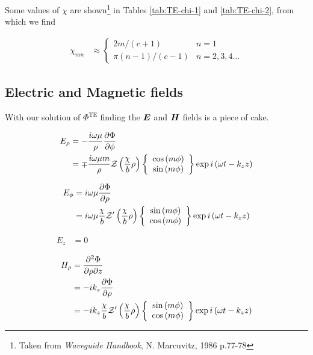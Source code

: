 \documentclass[twoside, a4paper]{article}
\begin{document}
Some values of $\chi$ are shown\footnote{Taken from \textit{Waveguide Handbook}, N. Marcuvitz, 1986 p.77-78} in Tables \ref{tab:TE-chi-1} and \ref{tab:TE-chi-2}, from which we find

\begin{align}
\chi_{mn} & \approx 
\left\{ 
	\begin{array}{cl}
		2m/(c+1)	&	n = 1 \\
		\pi (n-1)/(c-1)	&	n = 2,3,4 \ldots
	\end{array}
\right.
\end{align}




\subsection{Electric and Magnetic fields}
With our solution of $\Phi^{\text{TE}}$ finding the $\mbox{\boldmath$ E $}$ and $\mbox{\boldmath$ H $}$ fields is a piece of cake.

\begin{align*}
E_{\rho} & = - \frac{i \omega \mu}{\rho} \frac{\partial \Phi}{\partial \phi} \\
	& =
	\mp \frac{i \omega \mu m}{\rho}
	\mathcal{Z} \left( \frac{\chi}{b} \rho \right)
	\left\{
	\begin{array}{c}
		\cos \left( m \phi \right) \\
		\sin \left( m \phi \right)
	\end{array}
	\right\}
	\exp i \left( \omega t - k_z z \right)
\end{align*}

\begin{align*}
E_{\phi} & = i \omega \mu \frac{\partial \Phi}{\partial \rho} \\
	& =
	i \omega \mu \frac{\chi}{b}
	\mathcal{Z}' \left( \frac{\chi}{b} \rho \right)
	\left\{
	\begin{array}{c}
		\sin \left( m \phi \right) \\
		\cos \left( m \phi \right)
	\end{array}
	\right\}
	\exp i \left( \omega t - k_z z \right)
\end{align*}

\begin{align*}
E_z & = 0
\quad \quad \quad \quad \quad \quad \quad \quad \quad \quad
\quad \quad \quad \quad \quad \quad \quad \quad \quad \quad
\end{align*}

\begin{align*}
H_\rho & = \frac{\partial^2 \Phi}{\partial \rho \partial z} \\
& = - i k_z \frac{\partial \Phi}{\partial \rho} \\
& = - i k_z \frac{\chi}{b} 
	\mathcal{Z}' \left( \frac{\chi}{b} \rho \right)
	\left\{
	\begin{array}{c}
		\sin \left( m \phi \right) \\
		\cos \left( m \phi \right)
	\end{array}
	\right\}
	\exp i \left( \omega t - k_z z \right)
\end{align*}
\end{document}
